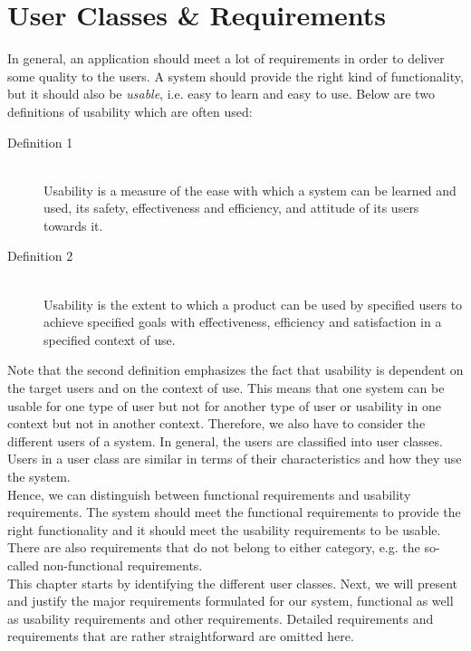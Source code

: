 \chapter{User Classes \& Requirements}\label{ch:requirements}

In general, an application should meet a lot of requirements in order to deliver some quality to the users. A system should provide the right kind of functionality, but it should also be \textit{usable}, i.e. easy to learn and easy to use. Below are two definitions of usability which are often used:
\begin{description}
	\item[Definition 1] \hfill \\
	Usability is a measure of the ease with which a system can be learned and used, its safety, effectiveness and efficiency, and attitude of its users towards it. \hfill \citep{usability-definition-preece}

	\item[Definition 2] \hfill \\
	Usability is the extent to which a product can be used by specified users to achieve specified goals with effectiveness, efficiency and satisfaction in a specified context of use. \hfill \citep{usability-definition-improved}
\end{description}

Note that the second definition emphasizes the fact that usability is dependent on the target users and on the context of use. This means that one system can be usable for one type of user but not for another type of user or usability in one context but not in another context. Therefore, we also have to consider the different users of a system. In general, the users are classified into user classes. Users in a user class are similar in terms of their characteristics and how they use the system.\\

Hence, we can distinguish between functional requirements and usability requirements. The system should meet the functional requirements to provide the right functionality and it should meet the usability requirements to be usable. There are also requirements that do not belong to either category, e.g. the so-called non-functional requirements.\\

This chapter starts by identifying the different user classes. Next, we will present and justify the major requirements formulated for our system, functional as well as usability requirements and other requirements. Detailed requirements and requirements that are rather straightforward are omitted here.



